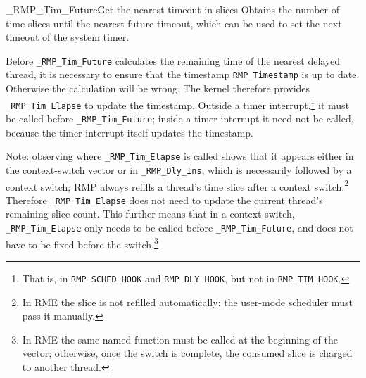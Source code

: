 \begin{apidesc}{\_RMP\_Tim\_Future}{Get the nearest timeout in slices}\label{port:Tim_Future}
    Obtains the number of time slices until the nearest future timeout, which can be used to set the next timeout of the system timer.
    \begin{apiparams}
    \end{apiparams}
    \begin{apiret}
    \end{apiret}
\end{apidesc}

Before \texttt{\_RMP\_Tim\_Future} calculates the remaining time of the nearest delayed thread, it is necessary to ensure that the timestamp \texttt{RMP\_Timestamp} is up to date.
Otherwise the calculation will be wrong.
The kernel therefore provides \texttt{\_RMP\_Tim\_Elapse} to update the timestamp.
Outside a timer interrupt,\footnote{That is, in \texttt{RMP\_SCHED\_HOOK} and \texttt{RMP\_DLY\_HOOK}, but not in \texttt{RMP\_TIM\_HOOK}.} it must be called before \texttt{\_RMP\_Tim\_Future}; inside a timer interrupt it need not be called, because the timer interrupt itself updates the timestamp.

Note: observing where \texttt{\_RMP\_Tim\_Elapse} is called shows that it appears either in the context-switch vector or in \texttt{\_RMP\_Dly\_Ins}, which is necessarily followed by a context switch; RMP always refills a thread's time slice after a context switch.\footnote{In RME the slice is not refilled automatically; the user-mode scheduler must pass it manually.}
Therefore \texttt{\_RMP\_Tim\_Elapse} does not need to update the current thread's remaining slice count.
This further means that in a context switch, \texttt{\_RMP\_Tim\_Elapse} only needs to be called before \texttt{\_RMP\_Tim\_Future}, and does not have to be fixed before the switch.\footnote{In RME the same-named function must be called at the beginning of the vector; otherwise, once the switch is complete, the consumed slice is charged to another thread.}

